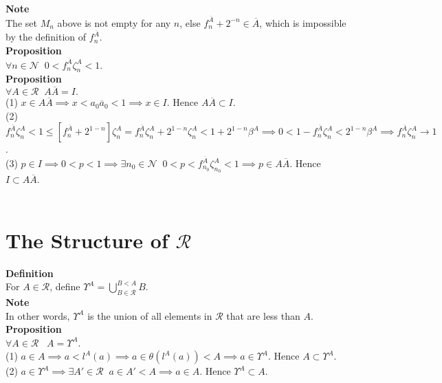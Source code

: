 \documentclass{article}
\newcommand{\targetset}{ \mathscr{R}}
\newcommand{\naturals}{ \mathscr{N}}
\newcommand{\leaper}{l}
\newcommand{\homo}{\theta}
\newcommand{\invmark}{\overline}
\newcommand{\umbrella}{\beta}
\newcommand{\prevert}{\zeta}
\newcommand{\Segmenter}{\Upsilon}
\begin{document}
\textbf{Note}\\
The set $M_n$  above is not empty for any $n$, else $f^{\invmark A}_n + 2^{-n} \in \invmark A$, which is impossible by the definition of $f^{\invmark A}_n$.\\

\textbf{Proposition}\\
$\forall n \in \naturals \;\; 0 < f^{\invmark A}_n \prevert^{ A}_n < 1.$\\




\textbf{Proposition}\\
$\forall A \in \targetset \;\;  A \invmark A = I.$ \\

(1) $x \in A \invmark A \implies x < a_0 \invmark a_0 < 1 \implies x \in I$. Hence $A \invmark A \subset I$.\\  
(2) $ f^{\invmark A}_n \prevert^{A}_n < 1 \le [f^{\invmark A}_n +2^{1-n}] \prevert^{ A}_n = f^{\invmark A}_n \prevert^{ A}_n + 2^{1-n}\prevert^{A}_n < 1 + 2^{1-n}\umbrella^A \implies 0 < 1 - f^{\invmark A}_n \prevert^{ A}_n < 2^{1-n}\umbrella^A   \implies f^{\invmark A}_n \prevert^{ A}_n \to 1$.\\
(3) $ p \in I \implies 0 < p < 1 \implies \exists n_0 \in \naturals \;\; 0 < p <  f^{\invmark A}_{n_0}  \prevert^{ A}_{n_0} < 1 \implies p \in A \invmark A$. Hence $ I \subset A \invmark A $.\\ \\

\section{The Structure of $\targetset$}


\textbf{Definition}\\
For $A \in \targetset$, define $\Segmenter^A = \bigcup_{B \in \targetset}^ {B < A} B$.\\

\textbf{Note}\\
In other words, $\Segmenter^A$ is the union of all elements in $\targetset$ that are less than $A$.\\

\textbf{Proposition}\\
$\forall A \in \targetset \;\;\; A = \Segmenter^A $.\\


(1) $a  \in A \implies a  < \leaper^A(a ) \implies a  \in \homo(\leaper^A(a ) ) < A \implies a \in  \Segmenter^A$. Hence $A \subset \Segmenter^A$.\\
(2) $a \in \Segmenter^A \implies \exists A' \in \targetset \;\; a \in A' < A \implies  a \in A.$ Hence $\Segmenter^A \subset  A.$\\
\end{document}
